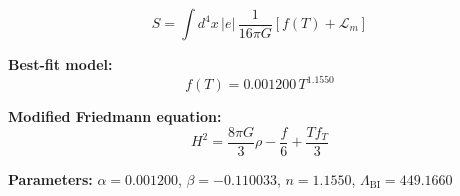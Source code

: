 
\begin{equation}
  S = \int d^4x \, |e| \, \frac{1}{16\pi G} \left[ f(T) + \mathcal{L}_m \right]
\end{equation}

\textbf{Best-fit model:}
\begin{equation}
  f(T) = 0.001200 \, T^{1.1550}
\end{equation}

\textbf{Modified Friedmann equation:}
\begin{equation}
  H^2 = \frac{8\pi G}{3} \rho - \frac{f}{6} + \frac{T f_T}{3}
\end{equation}

\textbf{Parameters:}
$\alpha = 0.001200$, \quad
$\beta = -0.110033$, \quad
$n = 1.1550$, \quad
$\Lambda_{\text{BI}} = 449.1660$